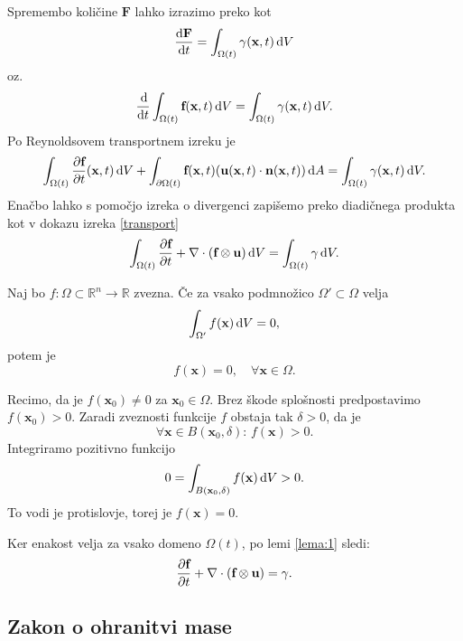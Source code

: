 \documentclass[mat2, tisk]{fmfdelo}
\newcommand{\R}{\mathbb R}
\newcommand{\bd}{\textbf}
\begin{document}
Spremembo količine $\bd{F}$ lahko izrazimo preko \bd{\text{$\gamma$}} kot 
\begin{equation}
\frac{\dif \bd{F}}{\dif t} = \int_{\Omega(t)} \bd{\text{$\gamma$}}(\bd{x}, t) \dif V
\end{equation}
 oz. 
\begin{equation}
\frac{\dif}{\dif t} \int_{\Omega(t)} \bd{f}(\bd{x}, t) \dif V = \int_{\Omega(t)} \bd{\text{$\gamma$}}(\bd{x}, t) \dif V.
\end{equation}
Po Reynoldsovem transportnem izreku je
\begin{equation}
\int_{\Omega(t)} \frac{\partial \bd{f}}{\partial t}(\bd{x}, t) \dif V + \int_{\partial \Omega(t)} \bd{f}(\bd{x}, t) (\bd{u}(\bd{x}, t) \cdot \bd{n}(\bd{x}, t)) \dif A = \int_{\Omega(t)} \bd{\text{$\gamma$}}(\bd{x}, t) \dif V.
\end{equation}
Enačbo lahko s pomočjo izreka o divergenci zapišemo preko diadičnega produkta kot v dokazu izreka \ref{transport}
\begin{equation}
\int_{\Omega(t)} \frac{\partial \bd{f}}{\partial t} + \nabla \cdot (\bd{f} \otimes \bd{u}) \dif V = \int_{\Omega(t)} \bd{\text{$\gamma$}} \dif V.
\end{equation}

\begin{lema}
  \label{lema:1}
Naj bo $f: \Omega \subset \R^n \rightarrow \R$ zvezna. 
Če za vsako podmnožico $\Omega' \subset \Omega$ velja 
$$
\int_{\Omega'} f(\bd{x}) \dif V = 0,
$$
potem je 
$$
f(\bd{x}) = 0, \quad \forall \bd{x} \in \Omega.
$$
\end{lema}

\begin{dokaz}
Recimo, da je $f(\bd{x}_0) \neq 0$ za $\bd{x}_0 \in \Omega$. Brez škode 
splošnosti predpostavimo $f(\bd{x}_0) > 0$. Zaradi 
zveznosti funkcije $f$ obstaja tak $\delta > 0$, da je 
$$
\forall \bd{x} \in B(\bd{x}_0, \delta):\, f(\bd{x}) > 0.
$$
Integriramo pozitivno funkcijo 
$$
0 = \int_{B(\bd{x}_0, \delta)} f(\bd{x}) \dif V > 0.
$$
To vodi je protislovje, torej je $f(\bd{x}) = 0$.
\end{dokaz}

Ker enakost velja za vsako domeno $\Omega(t)$, po lemi \ref{lema:1} sledi:
\begin{equation}
\frac{\partial \bd{f}}{\partial t}+ \nabla \cdot (\bd{f} \otimes \bd{u}) = \bd{\text{$\gamma$}}.
\end{equation}

\subsection{Zakon o ohranitvi mase}
\end{document}
